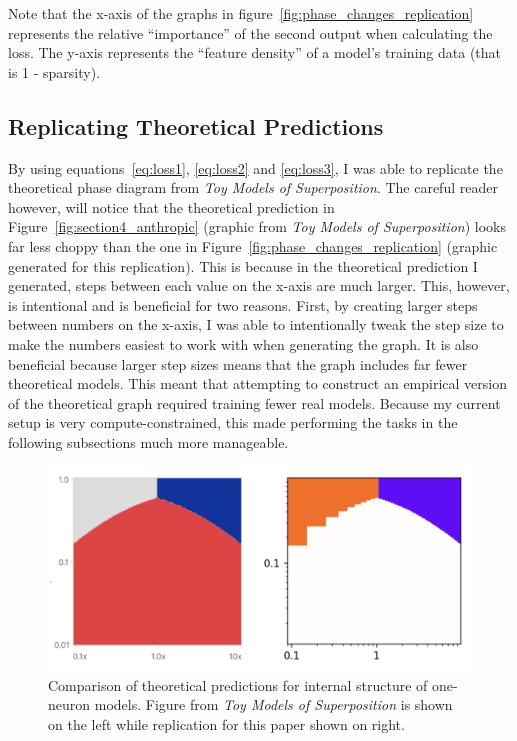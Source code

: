 \documentclass{article} %
\begin{document}
Note that the x-axis of the graphs in figure~\ref{fig:phase_changes_replication}
represents the relative ``importance'' of the second output when calculating the
loss. The y-axis represents the ``feature density'' of a model's training data
(that is 1 - sparsity).

\subsection{Replicating Theoretical Predictions}

By using equations~\ref{eq:loss1}, \ref{eq:loss2} and \ref{eq:loss3},
I was able to replicate the theoretical phase diagram from
\textit{Toy Models of Superposition}.
The careful reader however, will notice that the theoretical prediction in
Figure~\ref{fig:section4_anthropic} (graphic from \textit{Toy Models of 
Superposition}) looks far less choppy than the one in Figure~\ref{fig:phase_changes_replication} (graphic
generated for this replication). This is because in the theoretical prediction I 
generated, steps between each value on the x-axis are much larger. This, however, is
intentional and is beneficial for two reasons. First, by creating larger steps 
between numbers on
the x-axis, I was able to intentionally tweak the step size to make the numbers
easiest to work with when generating the graph. It is also beneficial because
larger step sizes means that the graph includes far fewer theoretical
models. This meant that attempting to construct an empirical version of the theoretical graph 
required training fewer real models. Because my current setup is very 
compute-constrained, this made performing the tasks in the following subsections
much more manageable.

\begin{figure}[h]
    \centering
    \includegraphics[width=0.5\linewidth]{phase_changes/images/theoretical_predictions.png}
    \captionsetup{font=footnotesize, width=0.7\linewidth} %
    \caption{
        Comparison of theoretical predictions for internal structure of one-neuron 
        models. Figure from \textit{Toy Models of Superposition} is shown on the 
        left while replication for this paper shown on right. 
    }
    \label{fig:theoretical_preditions}
\end{figure}
\end{document}
